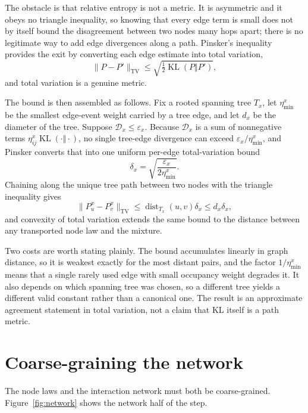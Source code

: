 \documentclass[11pt,letterpaper]{article}
\newcommand{\KL}{\operatorname{KL}}
\begin{document}
The obstacle is that relative entropy is not a metric. It is asymmetric and it obeys no triangle inequality, so knowing that every edge term is small does not by itself bound the disagreement between two nodes many hops apart; there is no legitimate way to add edge divergences along a path. Pinsker's inequality provides the exit by converting each edge estimate into total variation,
\[
  \|P-P'\|_{\mathrm{TV}}
  \leq
  \sqrt{\tfrac12\KL(P\Vert P')},
\]
and total variation is a genuine metric.

The bound is then assembled as follows. Fix a rooted spanning tree \(T_x\), let \(\eta_{\min}^x\) be the smallest edge-event weight carried by a tree edge, and let \(d_x\) be the diameter of the tree. Suppose \(\mathcal D_x\leq\varepsilon_x\). Because \(\mathcal D_x\) is a sum of nonnegative terms \(\eta_{ij}^x\KL(\cdot\Vert\cdot)\), no single tree-edge divergence can exceed \(\varepsilon_x/\eta_{\min}^x\), and Pinsker converts that into one uniform per-edge total-variation bound
\[
  \delta_x=\sqrt{\frac{\varepsilon_x}{2\eta_{\min}^x}}.
\]
Chaining along the unique tree path between two nodes with the triangle inequality gives
\[
  \|P_u^x-P_v^x\|_{\mathrm{TV}}
  \leq
  \operatorname{dist}_{T_x}(u,v)\delta_x
  \leq
  d_x\delta_x,
\]
and convexity of total variation extends the same bound to the distance between any transported node law and the mixture.

Two costs are worth stating plainly. The bound accumulates linearly in graph distance, so it is weakest exactly for the most distant pairs, and the factor \(1/\eta_{\min}^x\) means that a single rarely used edge with small occupancy weight degrades it. It also depends on which spanning tree was chosen, so a different tree yields a different valid constant rather than a canonical one. The result is an approximate agreement statement in total variation, not a claim that KL itself is a path metric.

\section{Coarse-graining the network}
\label{sec:network}

The node laws and the interaction network must both be coarse-grained. Figure~\ref{fig:network} shows the network half of the step.
\end{document}
